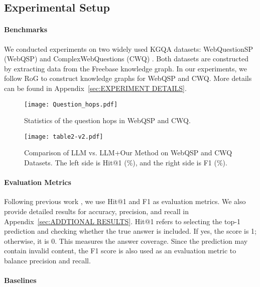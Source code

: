 \subsection{Experimental Setup}

\paragraph{Benchmarks}

We conducted experiments on two widely used KGQA datasets: WebQuestionSP (WebQSP) \cite{Yih2016TheVO} and ComplexWebQuestions (CWQ) \cite{Talmor2018TheWA}. Both datasets are constructed by extracting data from the Freebase knowledge graph. In our experiments, we follow RoG \cite{Luo2023ReasoningOG} to construct knowledge graphs for WebQSP and CWQ. More details can be found in Appendix~\ref{sec:EXPERIMENT DETAILS}. 

\begin{figure}[t]
  \centering
  \texttt{[image: Question\_hops.pdf]}  %
  \caption{Statistics of the question hops in WebQSP and CWQ.}  %
  \label{fig:question hops}  %
\end{figure}

\begin{figure*}[t]
  \centering
  \texttt{[image: table2-v2.pdf]}  %
  \caption{Comparison of LLM vs. LLM+Our Method on WebQSP and CWQ Datasets. The left side is Hit@1 (\%), and the right side is F1 (\%).}  %
  \label{fig:LLM Improvement}  %
\end{figure*}

\paragraph{Evaluation Metrics}

Following previous work \cite{Luo2023ReasoningOG, Zhang2022SubgraphRE, Li2024SimpleIE, Tan2024PathsoverGraphKG}, we use Hit@1 and F1 as evaluation metrics. We also provide detailed results for accuracy, precision, and recall in Appendix~\ref{sec:ADDTIONAL RESULTS}. Hit@1 refers to selecting the top-1 prediction and checking whether the true answer is included. If yes, the score is 1; otherwise, it is 0. This measures the answer coverage. Since the prediction may contain invalid content, the F1 score is also used as an evaluation metric to balance precision and recall.

\paragraph{Baselines}

